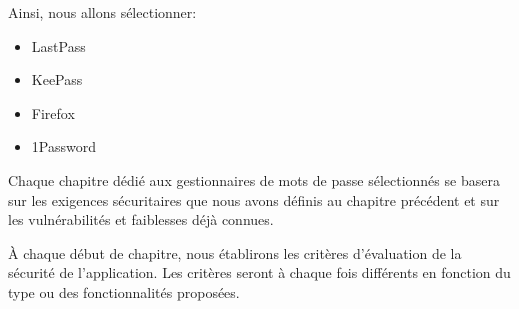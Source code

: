 Ainsi, nous allons sélectionner:
\begin{itemize}
	\item LastPass
	\item KeePass
	\item Firefox
	\item 1Password
\end{itemize}

Chaque chapitre dédié aux gestionnaires de mots de passe sélectionnés se basera sur les exigences sécuritaires que nous avons définis au chapitre précédent et sur les vulnérabilités et faiblesses déjà connues. 

À chaque début de chapitre, nous établirons les critères d'évaluation de la sécurité de l'application. Les critères seront à chaque fois différents en fonction du type ou des fonctionnalités proposées. 


